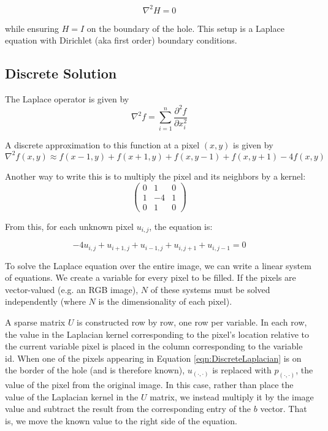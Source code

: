 \documentclass{InsightArticle}
\begin{document}
\begin{equation}
\nabla^2 H = 0
\end{equation}

while ensuring $H=I$ on the boundary of the hole. This setup is a Laplace equation with Dirichlet (aka first order) boundary conditions. 

\subsection{Discrete Solution}
The Laplace operator is given by
\begin{equation}
 \nabla^2 f = \sum_{i=1}^n \frac{\partial^2 f}{\partial x_i^2}
\end{equation}

A discrete approximation to this function at a pixel $(x,y)$ is given by
\begin{equation}
 \nabla^2 f(x,y) \approx f(x-1,y) + f(x+1,y) + f(x,y-1) + f(x,y+1) - 4f(x,y)
\end{equation}

Another way to write this is to multiply the pixel and its neighbors by a kernel:
\begin{equation}
\begin{pmatrix}
0 & 1 & 0 \\
1 & -4 & 1\\
0 & 1 & 0
\end{pmatrix}
\end{equation}


From this, for each unknown pixel $u_{i,j}$, the equation is:

\begin{equation}
\label{eqn:DiscreteLaplacian}
-4 u_{i,j} + u_{i+1,j} + u_{i-1,j} + u_{i,j+1} + u_{i,j-1} = 0
\end{equation}

To solve the Laplace equation over the entire image, we can write a linear system of equations. We create a variable for every pixel to be filled. If the pixels are vector-valued (e.g. an RGB image), $N$ of these systems must be solved independently (where $N$ is the dimensionality of each pixel).

A sparse matrix $U$ is constructed row by row, one row per variable. In each row, the value in the Laplacian kernel corresponding to the pixel's location relative to the current variable pixel is placed in the column corresponding to the variable id. When one of the pixels appearing in Equation \ref{eqn:DiscreteLaplacian} is on the border of the hole (and is therefore known), $u_{(\cdot,\cdot)}$ is replaced with $p_{(\cdot,\cdot)}$, the value of the pixel from the original image. In this case, rather than place the value of the Laplacian kernel in the $U$ matrix, we instead multiply it by the image value and subtract the result from the corresponding entry of the $b$ vector. That is, we move the known value to the right side of the equation.
\end{document}
